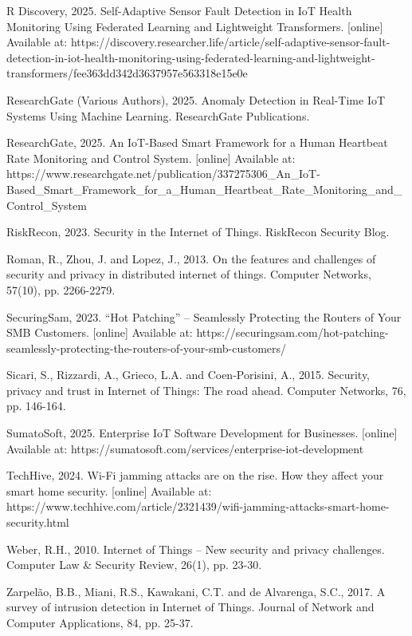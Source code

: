 R Discovery, 2025. Self-Adaptive Sensor Fault Detection in IoT Health Monitoring Using Federated Learning and Lightweight Transformers. [online] Available at: https://discovery.researcher.life/article/self-adaptive-sensor-fault-detection-in-iot-health-monitoring-using-federated-learning-and-lightweight-transformers/fee363dd342d3637957e563318e15e0e

ResearchGate (Various Authors), 2025. Anomaly Detection in Real-Time IoT Systems Using Machine Learning. ResearchGate Publications.

ResearchGate, 2025. An IoT-Based Smart Framework for a Human Heartbeat Rate Monitoring and Control System. [online] Available at: https://www.researchgate.net/publication/337275306\_An\_IoT-Based\_Smart\_Framework\_for\_a\_Human\_Heartbeat\_Rate\_Monitoring\_and\_Control\_System

RiskRecon, 2023. Security in the Internet of Things. RiskRecon Security Blog.

Roman, R., Zhou, J. and Lopez, J., 2013. On the features and challenges of security and privacy in distributed internet of things. Computer Networks, 57(10), pp. 2266-2279.

SecuringSam, 2023. ``Hot Patching'' -- Seamlessly Protecting the Routers of Your SMB Customers. [online] Available at: https://securingsam.com/hot-patching-seamlessly-protecting-the-routers-of-your-smb-customers/

Sicari, S., Rizzardi, A., Grieco, L.A. and Coen-Porisini, A., 2015. Security, privacy and trust in Internet of Things: The road ahead. Computer Networks, 76, pp. 146-164.

SumatoSoft, 2025. Enterprise IoT Software Development for Businesses. [online] Available at: https://sumatosoft.com/services/enterprise-iot-development

TechHive, 2024. Wi-Fi jamming attacks are on the rise. How they affect your smart home security. [online] Available at: https://www.techhive.com/article/2321439/wifi-jamming-attacks-smart-home-security.html

Weber, R.H., 2010. Internet of Things -- New security and privacy challenges. Computer Law \& Security Review, 26(1), pp. 23-30.

Zarpelão, B.B., Miani, R.S., Kawakani, C.T. and de Alvarenga, S.C., 2017. A survey of intrusion detection in Internet of Things. Journal of Network and Computer Applications, 84, pp. 25-37.
